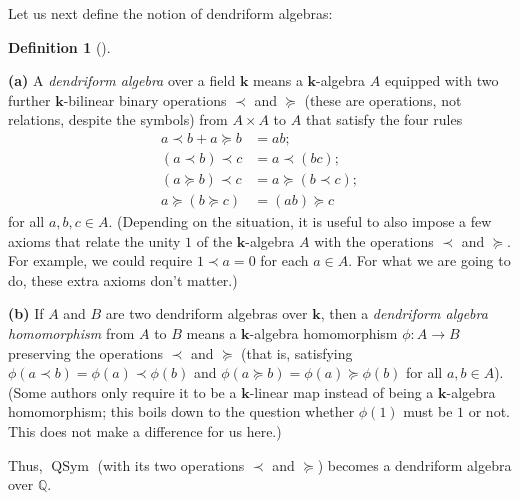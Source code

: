 \documentclass[numbers=enddot,12pt,final,onecolumn,notitlepage]{scrartcl}%
\theoremstyle{definition}
\newtheorem{defi}[theo]{Definition}
\newenvironment{definition}[1][]
{\begin{defi}[#1]\begin{leftbar}}
{\end{leftbar}\end{defi}}
\newenvironment{vershort}{}{}
\begin{document}
\begin{vershort}
Let us next define the notion of dendriform algebras:

\begin{definition}
\textbf{(a)} A \textit{dendriform algebra} over a field $\mathbf{k}$ means a
$\mathbf{k}$-algebra $A$ equipped with two further $\mathbf{k}$-bilinear
binary operations $\left.  \prec\right.  $ and $\left.  \succeq\right.  $
(these are operations, not relations, despite the symbols) from $A\times A$ to
$A$ that satisfy the four rules%
\begin{align*}
a\left.  \prec\right.  b+a\left.  \succeq\right.  b  &  =ab;\\
\left(  a\left.  \prec\right.  b\right)  \left.  \prec\right.  c  &  =a\left.
\prec\right.  \left(  bc\right)  ;\\
\left(  a\left.  \succeq\right.  b\right)  \left.  \prec\right.  c  &
=a\left.  \succeq\right.  \left(  b\left.  \prec\right.  c\right)  ;\\
a\left.  \succeq\right.  \left(  b\left.  \succeq\right.  c\right)   &
=\left(  ab\right)  \left.  \succeq\right.  c
\end{align*}
for all $a,b,c\in A$. (Depending on the situation, it is useful to also impose
a few axioms that relate the unity $1$ of the $\mathbf{k}$-algebra $A$ with
the operations $\left.  \prec\right.  $ and $\left.  \succeq\right.  $. For
example, we could require $1\left.  \prec\right.  a=0$ for each $a\in A$. For
what we are going to do, these extra axioms don't matter.)

\textbf{(b)} If $A$ and $B$ are two dendriform algebras over $\mathbf{k}$,
then a \textit{dendriform algebra homomorphism} from $A$ to $B$ means a
$\mathbf{k}$-algebra homomorphism $\phi:A\rightarrow B$ preserving the
operations $\left.  \prec\right.  $ and $\left.  \succeq\right.  $ (that is,
satisfying $\phi\left(  a\left.  \prec\right.  b\right)  =\phi\left(
a\right)  \left.  \prec\right.  \phi\left(  b\right)  $ and $\phi\left(
a\left.  \succeq\right.  b\right)  =\phi\left(  a\right)  \left.
\succeq\right.  \phi\left(  b\right)  $ for all $a,b\in A$). (Some authors
only require it to be a $\mathbf{k}$-linear map instead of being a
$\mathbf{k}$-algebra homomorphism; this boils down to the question whether
$\phi\left(  1\right)  $ must be $1$ or not. This does not make a difference
for us here.)
\end{definition}

Thus, $\operatorname*{QSym}$ (with its two operations $\left.  \prec\right.  $
and $\left.  \succeq\right.  $) becomes a dendriform algebra over $\mathbb{Q}$.


\end{vershort}
\end{document}
